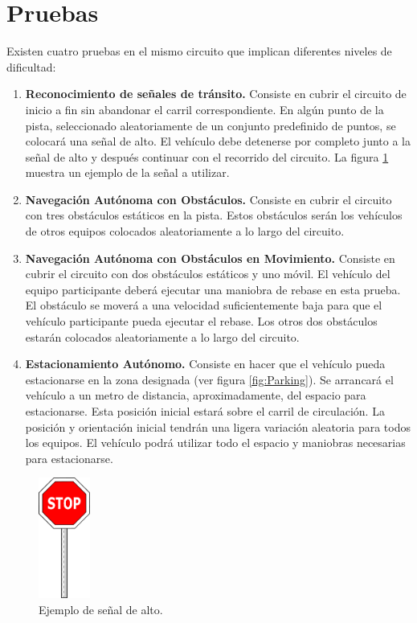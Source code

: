 \documentclass[letterpaper,12pt]{article}
\begin{document}
\section{Pruebas}
Existen cuatro pruebas en el mismo circuito que implican diferentes niveles de dificultad:

\begin{enumerate}
\item \textbf{Reconocimiento de señales de tránsito.} Consiste en cubrir el circuito de inicio a fin sin abandonar el carril correspondiente. En algún punto de la pista, seleccionado aleatoriamente de un conjunto predefinido de puntos, se colocará una señal de alto. El vehículo debe detenerse por completo junto a la señal de alto y después continuar con el recorrido del circuito. La figura \ref{fig:stopsign} muestra un ejemplo de la señal a utilizar. 
\item \textbf{Navegación Autónoma con Obstáculos.} Consiste en cubrir el circuito con tres obstáculos estáticos en la pista. Estos obstáculos serán los vehículos de otros equipos colocados aleatoriamente a lo largo del circuito.
\item \textbf{Navegación Autónoma con Obstáculos en Movimiento.} Consiste en cubrir el circuito con dos obstáculos estáticos y uno móvil. El vehículo del equipo participante deberá ejecutar una maniobra de rebase en esta prueba. El obstáculo se moverá a una velocidad suficientemente baja para que el vehículo participante pueda ejecutar el rebase. Los otros dos obstáculos estarán colocados aleatoriamente a lo largo del circuito.
  \item \textbf{Estacionamiento Autónomo.} Consiste en hacer que el vehículo pueda estacionarse en la zona designada (ver figura \ref{fig:Parking}). Se arrancará el vehículo a un metro de distancia, aproximadamente, del espacio para estacionarse. Esta posición inicial estará sobre el carril de circulación. La posición y orientación inicial tendrán una ligera variación aleatoria para todos los equipos. El vehículo podrá utilizar todo el espacio y maniobras necesarias para estacionarse. 
\end{enumerate}
\begin{figure}
  \centering
  \includegraphics[width=0.15\textwidth]{Figures/alto.png}
  \caption{Ejemplo de señal de alto.}
  \label{fig:stopsign}
\end{figure}
\end{document}
